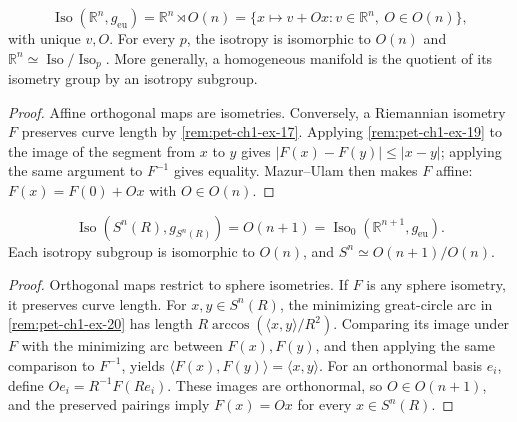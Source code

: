 \begin{example}
  \label{ex:pet-ch1-isometry-group-euclidean}
  \leanok
  \[
    \operatorname{Iso}(\mathbb{R}^n,g_{\mathrm{eu}})
      =\mathbb{R}^n\rtimes O(n)
      =\{x\mapsto v+Ox:v\in\mathbb{R}^n,\ O\in O(n)\},
  \]
  with unique $v,O$. For every $p$, the isotropy is isomorphic to $O(n)$ and
  $\mathbb{R}^n\simeq\operatorname{Iso}/\operatorname{Iso}_p$. More generally,
  a homogeneous manifold is the quotient of its isometry group by an isotropy
  subgroup.
\end{example}
\begin{proof}
  \leanok
  \sketch
  Affine orthogonal maps are isometries. Conversely, a Riemannian isometry $F$
  preserves curve length by \cref{rem:pet-ch1-ex-17}. Applying
  \cref{rem:pet-ch1-ex-19} to the image of the segment from $x$ to $y$ gives
  $|F(x)-F(y)|\le |x-y|$; applying the same argument to $F^{-1}$ gives
  equality. Mazur--Ulam then makes $F$ affine:
  $F(x)=F(0)+Ox$ with $O\in O(n)$.
\end{proof}

\begin{example}
  \label{ex:pet-ch1-isometry-group-sphere}
  \leanok
  \[
    \operatorname{Iso}(S^n(R),g_{S^n(R)})=O(n+1)
      =\operatorname{Iso}_0(\mathbb{R}^{n+1},g_{\mathrm{eu}}).
  \]
  Each isotropy subgroup is isomorphic to $O(n)$, and
  $S^n\simeq O(n+1)/O(n)$.
\end{example}
\begin{proof}
  \leanok
  \sketch
  Orthogonal maps restrict to sphere isometries. If $F$ is any sphere
  isometry, it preserves curve length. For $x,y\in S^n(R)$, the minimizing
  great-circle arc in \cref{rem:pet-ch1-ex-20} has length
  $R\arccos(\langle x,y\rangle/R^2)$. Comparing its image under $F$ with the
  minimizing arc between $F(x),F(y)$, and then applying the same comparison to
  $F^{-1}$, yields
  $\langle F(x),F(y)\rangle=\langle x,y\rangle$.
  For an orthonormal basis $e_i$, define $Oe_i=R^{-1}F(Re_i)$. These images are
  orthonormal, so $O\in O(n+1)$, and the preserved pairings imply $F(x)=Ox$
  for every $x\in S^n(R)$.
\end{proof}

